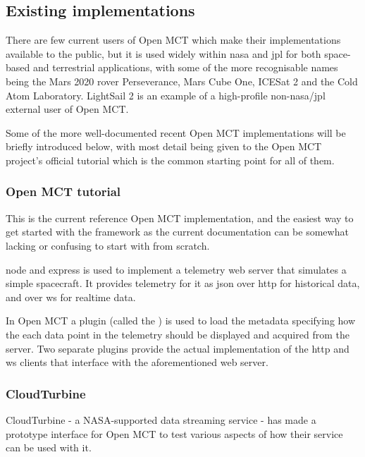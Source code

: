 
\subsection{Existing implementations}
There are few current users of Open MCT which make their implementations available to the public, but it is used widely within \acrshort{nasa} and \acrshort{jpl} for both space-based and terrestrial applications, with some of the more recognisable names being the Mars 2020 rover Perseverance, Mars Cube One, ICESat 2 and the Cold Atom Laboratory. LightSail 2 is an example of a high-profile non-\acrshort{nasa}/\acrshort{jpl} external user of Open MCT. \cite{omct_users}

Some of the more well-documented recent Open MCT implementations will be briefly introduced below, with most detail being given to the Open MCT project's official tutorial which is the common starting point for all of them.

\subsubsection{Open MCT tutorial}
This is the current reference Open MCT implementation, and the easiest way to get started with the framework as the current documentation can be somewhat lacking or confusing to start with from scratch.

\Gls{node} and \Gls{express} is used to implement a telemetry web server that simulates a simple spacecraft. It provides telemetry for it as \acrshort{json} over \acrshort{http} for historical data, and over \Gls{ws} for realtime data.

In Open MCT a plugin (called the ) is used to load the metadata specifying how the each data point in the telemetry should be displayed and acquired from the server. Two separate plugins provide the actual implementation of the \acrshort{http} and \Gls{ws} clients that interface with the aforementioned web server.


\subsubsection{CloudTurbine}
CloudTurbine - a NASA-supported data streaming service - has made a prototype interface for Open MCT to test various aspects of how their service can be used with it.

